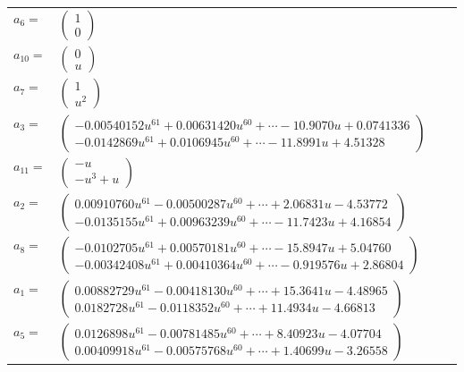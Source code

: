 \documentclass[1p]{elsarticle_modified}
\theoremstyle{definition}
\begin{document}
\begin{tabular}{m{7pt} m{180pt} m{7pt} m{180pt} }
\flushright $a_{6}=$&$\begin{pmatrix}1\\0\end{pmatrix}$ \\
\flushright $a_{10}=$&$\begin{pmatrix}0\\u\end{pmatrix}$ \\
\flushright $a_{7}=$&$\begin{pmatrix}1\\u^2\end{pmatrix}$ \\
\flushright $a_{3}=$&$\begin{pmatrix}-0.00540152 u^{61}+0.00631420 u^{60}+\cdots-10.9070 u+0.0741336\\-0.0142869 u^{61}+0.0106945 u^{60}+\cdots-11.8991 u+4.51328\end{pmatrix}$ \\
\flushright $a_{11}=$&$\begin{pmatrix}- u\\- u^3+u\end{pmatrix}$ \\
\flushright $a_{2}=$&$\begin{pmatrix}0.00910760 u^{61}-0.00500287 u^{60}+\cdots+2.06831 u-4.53772\\-0.0135155 u^{61}+0.00963239 u^{60}+\cdots-11.7423 u+4.16854\end{pmatrix}$ \\
\flushright $a_{8}=$&$\begin{pmatrix}-0.0102705 u^{61}+0.00570181 u^{60}+\cdots-15.8947 u+5.04760\\-0.00342408 u^{61}+0.00410364 u^{60}+\cdots-0.919576 u+2.86804\end{pmatrix}$ \\
\flushright $a_{1}=$&$\begin{pmatrix}0.00882729 u^{61}-0.00418130 u^{60}+\cdots+15.3641 u-4.48965\\0.0182728 u^{61}-0.0118352 u^{60}+\cdots+11.4934 u-4.66813\end{pmatrix}$ \\
\flushright $a_{5}=$&$\begin{pmatrix}0.0126898 u^{61}-0.00781485 u^{60}+\cdots+8.40923 u-4.07704\\0.00409918 u^{61}-0.00575768 u^{60}+\cdots+1.40699 u-3.26558\end{pmatrix}$ \\

\end{tabular}
\end{document}
